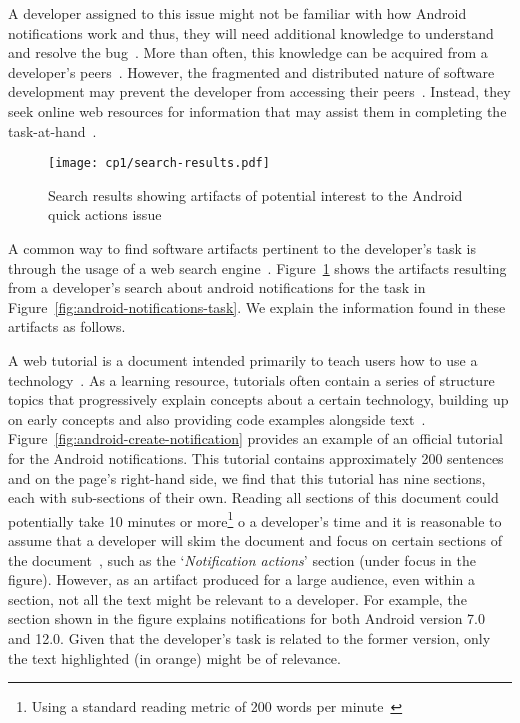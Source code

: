  
 \medskip
 A developer assigned to this issue might not be familiar with how Android notifications work and thus, they will need additional knowledge to understand and resolve the bug~\cite{ko2007, Li2013, sillito2006}. 
 More than often, this knowledge can be acquired from a developer's peers~\cite{singer2011}. 
 However, the fragmented and distributed nature of software development  
 may prevent the developer from accessing their peers~\cite{ko2007}.
 Instead, they seek online web resources for information 
 that may assist them in completing the task-at-hand~\cite{Xia2017, rao2020}.
 
 
 
 
 
 \begin{figure}
     \centering
     \texttt{[image: cp1/search-results.pdf]}
     \caption{Search results showing artifacts of potential interest to the Android quick actions issue}
     \label{fig:android-search-results}
 \end{figure}
 
 
 
A common way to find software artifacts
pertinent to the developer's task
is through the usage of a web search engine~\cite{Brandt2009a, Li2013}.
Figure~\ref{fig:android-search-results}
shows the artifacts resulting from a developer's search 
about android notifications for the task in Figure~\ref{fig:android-notifications-task}.
We explain the information found in these artifacts as follows.




A web tutorial is a document intended primarily to teach users how to use 
a technology~\cite{arya2020}. 
As a learning resource, tutorials often contain a series of structure topics 
that progressively explain concepts about a certain technology, 
building up on early concepts and also providing code examples alongside text~\cite{Jiang2016b,Jiang2017}. 
Figure~\ref{fig:android-create-notification} provides an example 
of an official tutorial for the Android notifications. 
This tutorial contains  approximately 200 sentences
and on the page's right-hand side, we find that this tutorial
has nine sections, each with sub-sections of their own. 
Reading all sections of this document could potentially 
take 10 minutes or more\footnote{Using a standard reading metric of 200 words per minute~\cite{Just1980}} o a developer's time 
and it is reasonable to assume that a 
developer will skim the document and focus on 
certain sections of the document~\cite{Li2013}, such as the `\textit{Notification actions}'
section (under focus in the figure). 
However, as an artifact produced for a large audience, 
even within a section, not all the text might be relevant to 
a developer. For example, the section shown in the figure explains 
notifications for both Android version 7.0 and 12.0.
Given that the developer's task is related to the former version,
only the text highlighted (in orange)
might be of relevance.



